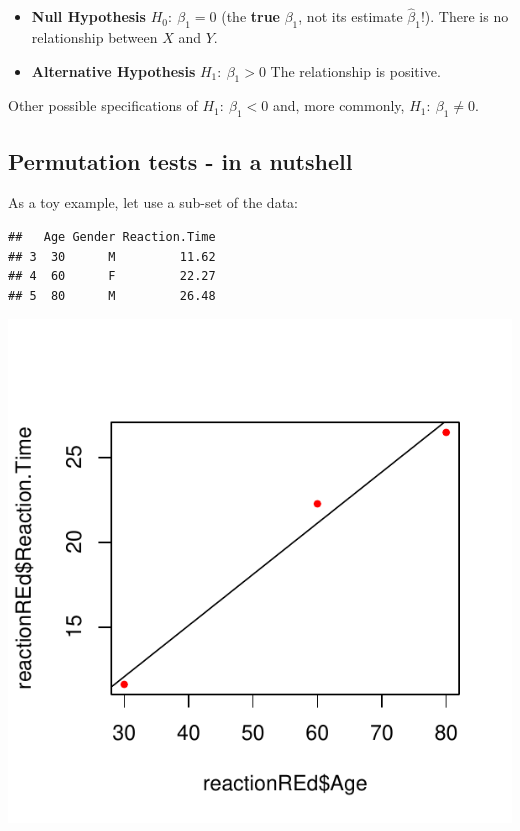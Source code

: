 \documentclass[]{article}
\begin{document}
\begin{itemize}
\item
  \textbf{Null Hypothesis} \(H_0: \ \beta_1=0\) (the \textbf{true}
  \(\beta_1\), not its estimate \(\hat{\beta}_1\)!). There is no
  relationship between \(X\) and \(Y\).
\item
  \textbf{Alternative Hypothesis }\(H_1: \ \beta_1 >0\) The relationship
  is positive.
\end{itemize}

Other possible specifications of \(H_1: \ \beta_1< 0\) and, more
commonly, \(H_1: \ \beta_1 \neq 0\).

\subsection{Permutation tests - in a
nutshell}\label{permutation-tests---in-a-nutshell}

As a toy example, let use a sub-set of the data:

\begin{verbatim}
##   Age Gender Reaction.Time
## 3  30      M         11.62
## 4  60      F         22.27
## 5  80      M         26.48
\end{verbatim}

\begin{center}\includegraphics{inference_booklet_files/figure-latex/unnamed-chunk-7-1} \end{center}
\end{document}
